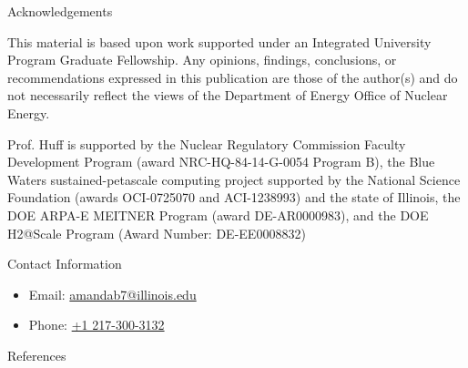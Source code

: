 \documentclass[final]{beamer}
\newlength{\onecolwid}
\newlength{\threecolwid}
\begin{document}
\begin{frame}[t]
\begin{columns}[t,totalwidth=\threecolwid]
\begin{column}{\onecolwid}

\begin{block}{Acknowledgements}
	
	This material is based upon work supported under an Integrated University 
Program Graduate Fellowship. Any opinions, findings, conclusions, or 
recommendations expressed in this publication are those of the author(s) 
and do not necessarily reflect the views of the Department of Energy Office 
of Nuclear Energy.

Prof. Huff is supported by the Nuclear Regulatory Commission Faculty
Development Program (award NRC-HQ-84-14-G-0054 Program B), the Blue Waters
sustained-petascale computing project supported by the National Science
Foundation (awards OCI-0725070 and ACI-1238993) and the state of Illinois, the
DOE ARPA-E MEITNER Program (award DE-AR0000983), and the DOE H2@Scale Program
(Award Number: DE-EE0008832)
	
\end{block}



\begin{alertblock}{Contact Information}
	\begin{itemize}
		\item Email: \href{mailto:amandab7@illinois.edu}{amandab7@illinois.edu}
		\item Phone: \href{tel:12173003132}{+1 217-300-3132}
	\end{itemize}
	
\end{alertblock}

\begin{block}{References}

	{\footnotesize 
	}
\end{block}





\end{column} %

\end{columns} %

\end{frame} %
\end{document}
